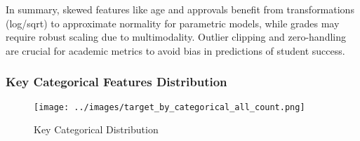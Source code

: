 \documentclass[twoside,final]{hcmut-report}
\begin{document}
In summary, skewed features like age and approvals benefit from transformations (log/sqrt) to approximate normality for parametric models, while grades may require robust scaling due to multimodality. Outlier clipping and zero-handling are crucial for academic metrics to avoid bias in predictions of student success.

\subsubsection{Key Categorical Features Distribution}

\begin{figure}[H]
  \centering
  \texttt{[image: ../images/target\_by\_categorical\_all\_count.png]}
  \caption{Key Categorical Distribution}
  \label{cat_dist_dist}
\end{figure}
\end{document}
